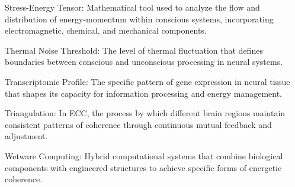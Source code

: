 Stress-Energy Tensor: Mathematical tool used to analyze the flow and distribution of energy-momentum within conscious systems, incorporating electromagnetic, chemical, and mechanical components.

Thermal Noise Threshold: The level of thermal fluctuation that defines boundaries between conscious and unconscious processing in neural systems.

Transcriptomic Profile: The specific pattern of gene expression in neural tissue that shapes its capacity for information processing and energy management.

Triangulation: In ECC, the process by which different brain regions maintain consistent patterns of coherence through continuous mutual feedback and adjustment.

Wetware Computing: Hybrid computational systems that combine biological components with engineered structures to achieve specific forms of energetic coherence.